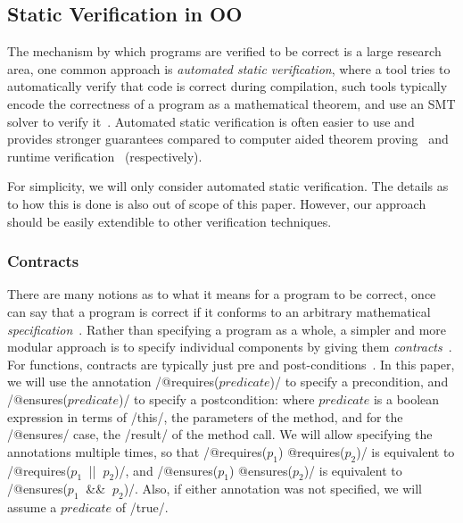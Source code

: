\subsection{Static Verification in OO}
The mechanism by which programs are verified to be correct is a large research area, one common approach is \emph{automated static verification}, where a tool tries to automatically verify that code is correct during compilation, such tools typically encode the correctness of a program as a mathematical theorem, and use an SMT solver to verify it~\cite{?}. Automated static verification is often easier to use and provides stronger guarantees compared to computer aided theorem proving~\cite{?} and runtime verification~\cite{?} (respectively). 

For simplicity, we will only consider automated static verification. The details as to how this is done is also out of scope of this paper. However, our approach should be easily extendible to other verification techniques.

\subsubsection{Contracts}
There are many notions as to what it means for a program to be correct, once can say that a program is correct if it conforms to an arbitrary mathematical \emph{specification}~\cite{?}. Rather than specifying a program as a whole, a simpler and more modular approach is to specify individual components by giving them \emph{contracts}~\cite{?}. For functions, contracts are typically just pre and post-conditions~\cite{?}. In this paper, we will use the annotation /@requires($predicate$)/ to specify a precondition, and /@ensures($predicate$)/ to specify a postcondition: where $predicate$ is a boolean expression in terms of /this/, the parameters of the method, and for the /@ensures/ case, the /result/ of the method call. We will allow specifying the annotations multiple times, so that /@requires($p_1$) @requires($p_2$)/ is equivalent to /@requires($p_1\ $ || $\ p_2$)/, and /@ensures($p_1$) @ensures($p_2$)/ is equivalent to /@ensures($p_1\ $ && $\ p_2$)/. Also, if either annotation was not specified, we will assume a $predicate$ of /true/. 

